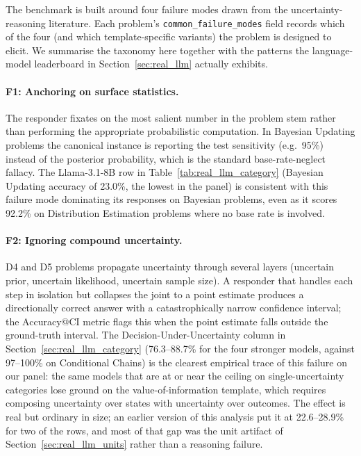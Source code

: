 \documentclass{article}
\begin{document}
The benchmark is built around four failure modes drawn from the uncertainty-reasoning literature. Each problem's \texttt{common\_failure\_modes} field records which of the four (and which template-specific variants) the problem is designed to elicit. We summarise the taxonomy here together with the patterns the language-model leaderboard in Section~\ref{sec:real_llm} actually exhibits.

\paragraph{F1: Anchoring on surface statistics.} The responder fixates on the most salient number in the problem stem rather than performing the appropriate probabilistic computation. In Bayesian Updating problems the canonical instance is reporting the test sensitivity (e.g.\ 95\%) instead of the posterior probability, which is the standard base-rate-neglect fallacy. The Llama-3.1-8B row in Table~\ref{tab:real_llm_category} (Bayesian Updating accuracy of 23.0\%, the lowest in the panel) is consistent with this failure mode dominating its responses on Bayesian problems, even as it scores 92.2\% on Distribution Estimation problems where no base rate is involved.

\paragraph{F2: Ignoring compound uncertainty.} D4 and D5 problems propagate uncertainty through several layers (uncertain prior, uncertain likelihood, uncertain sample size). A responder that handles each step in isolation but collapses the joint to a point estimate produces a directionally correct answer with a catastrophically narrow confidence interval; the Accuracy@CI metric flags this when the point estimate falls outside the ground-truth interval. The Decision-Under-Uncertainty column in Section~\ref{sec:real_llm_category} (76.3--88.7\% for the four stronger models, against 97--100\% on Conditional Chains) is the clearest empirical trace of this failure on our panel: the same models that are at or near the ceiling on single-uncertainty categories lose ground on the value-of-information template, which requires composing uncertainty over states with uncertainty over outcomes. The effect is real but ordinary in size; an earlier version of this analysis put it at 22.6--28.9\% for two of the rows, and most of that gap was the unit artifact of Section~\ref{sec:real_llm_units} rather than a reasoning failure.
\end{document}

